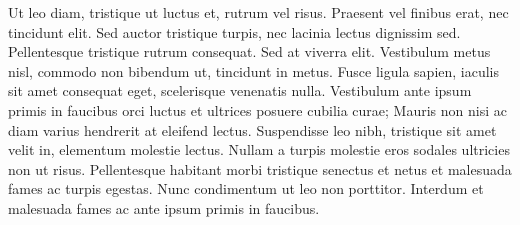 Ut leo diam, tristique ut luctus et, rutrum vel risus. Praesent vel finibus erat, nec tincidunt elit. Sed auctor tristique turpis, nec lacinia lectus dignissim sed. Pellentesque tristique rutrum consequat. Sed at viverra elit. Vestibulum metus nisl, commodo non bibendum ut, tincidunt in metus. Fusce ligula sapien, iaculis sit amet consequat eget, scelerisque venenatis nulla. Vestibulum ante ipsum primis in faucibus orci luctus et ultrices posuere cubilia curae; Mauris non nisi ac diam varius hendrerit at eleifend lectus. Suspendisse leo nibh, tristique sit amet velit in, elementum molestie lectus. Nullam a turpis molestie eros sodales ultricies non ut risus. Pellentesque habitant morbi tristique senectus et netus et malesuada fames ac turpis egestas. Nunc condimentum ut leo non porttitor. Interdum et malesuada fames ac ante ipsum primis in faucibus.